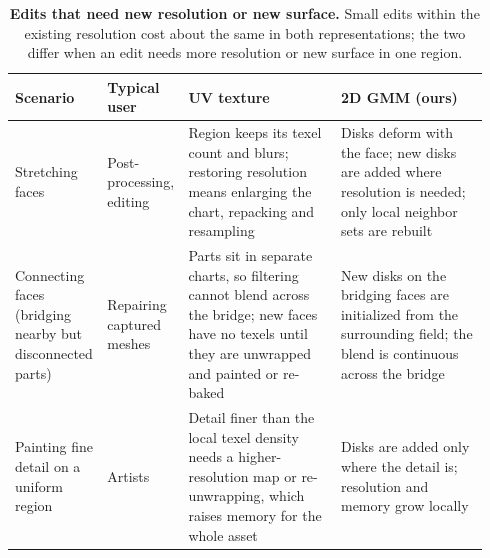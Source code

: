 \begin{table}[t]
\color{addcolor}
\centering
\scriptsize
\setlength{\tabcolsep}{3pt}
\caption{\textbf{Edits that need new resolution or new surface.} Small edits within the existing
resolution cost about the same in both representations; the two differ when an edit needs more
resolution or new surface in one region.}
\label{tab:editing}
\begin{tabular}{@{}p{0.17\linewidth}p{0.14\linewidth}p{0.32\linewidth}p{0.31\linewidth}@{}}
\toprule
Scenario & Typical user & UV texture & 2D GMM (ours) \\
\midrule
Stretching faces & Post-processing, editing & Region keeps its texel count and blurs; restoring resolution means enlarging the chart, repacking and resampling & Disks deform with the face; new disks are added where resolution is needed; only local neighbor sets are rebuilt \\
\midrule
Connecting faces (bridging nearby but disconnected parts) & Repairing captured meshes & Parts sit in separate charts, so filtering cannot blend across the bridge; new faces have no texels until they are unwrapped and painted or re-baked & New disks on the bridging faces are initialized from the surrounding field; the blend is continuous across the bridge \\
\midrule
Painting fine detail on a uniform region & Artists & Detail finer than the local texel density needs a higher-resolution map or re-unwrapping, which raises memory for the whole asset & Disks are added only where the detail is; resolution and memory grow locally \\
\bottomrule
\end{tabular}
\end{table}

